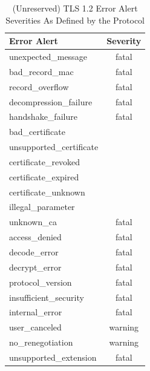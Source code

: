 \documentclass[12pt]{article}
\begin{document}
\begin{table}[!hbt]
\centering
\caption{(Unreserved) TLS 1.2 Error Alert Severities As Defined by the Protocol\label{table:error-severity}}
\begin{tabular}{|lc|} 
\hline
Error Alert              & Severity  \\ 
\hline
unexpected\_message      & fatal     \\
bad\_record\_mac         & fatal     \\
record\_overflow         & fatal     \\
decompression\_failure   & fatal     \\
handshake\_failure       & fatal     \\
bad\_certificate         &           \\
unsupported\_certificate &           \\
certificate\_revoked     &           \\
certificate\_expired     &           \\
certificate\_unknown     &           \\
illegal\_parameter       &           \\
unknown\_ca              & fatal     \\
access\_denied           & fatal     \\
decode\_error            & fatal     \\
decrypt\_error           & fatal     \\
protocol\_version        & fatal     \\
insufficient\_security   & fatal     \\
internal\_error          & fatal     \\
user\_canceled           & warning   \\
no\_renegotiation        & warning   \\
unsupported\_extension   & fatal    \\
\hline
\end{tabular}
\end{table}
\end{document}
